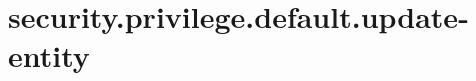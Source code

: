 \section{security.privilege.default.update-entity}
\label{configuration:SecurityPrivilegeDefaultUpdateEntity}
\TODO
